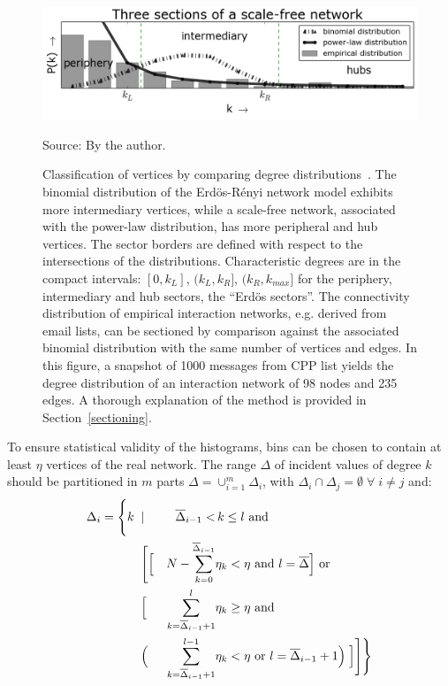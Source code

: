 \clearpage
\begin{figure}[!h]
\centering
\includegraphics[width=\textwidth]{figs/fser__}
\caption{Classification of vertices by comparing degree
distributions~\cite{3setores}.
The binomial distribution of the Erd\"os-R\'enyi network model exhibits more intermediary vertices, while a scale-free network, associated with the power-law distribution, has more peripheral and hub vertices. The sector borders are defined with respect to the intersections of the distributions. Characteristic degrees are in the compact intervals: $[0,k_L]$, $(k_L,k_R]$, $(k_R,k_{max}]$ for the periphery, intermediary and hub sectors, the ``Erd\"os sectors''.
The connectivity distribution of empirical interaction networks, e.g. derived from email lists, can be sectioned by comparison against the associated binomial distribution with the same number of vertices and edges. In this figure, a snapshot of 1000 messages from CPP list yields the degree distribution of an interaction network of 98 nodes and 235 edges. A thorough explanation of the method is provided in Section~\ref{sectioning}.}
\label{fig:setores}
\begin{flushleft}\footnotesize
Source: By the author.\
\end{flushleft}
\end{figure}

To ensure statistical validity of the histograms, bins can be chosen to contain at least $\eta$ vertices of the real network.
The range $\Delta$ of incident values of degree $k$ should be partitioned in $m$ parts $\Delta=\cup_{i=1}^m \Delta_i$,
with $\Delta_i\cap \Delta_j=\emptyset \; \forall\; i \neq j$ and:
\begin{align}
\Delta_i =\Biggl\{ k\;\; & | & \overline{\Delta}_{i-1}< &\, k\leq l \text{ and }\;\;\;\;\;\;\;\;\;\;\;\;\nonumber\\
& \Biggl[ \Bigl[ & N - \sum_{k=0}^{\overline{\Delta}_{i-1}} & \eta_k< \eta \text{ and } l = \overline{\Delta} \Bigr] \text{ or }\\
& \Bigl[ & \sum_{k=\overline{\Delta}_{i-1}+1}^l & \eta_k \geq \eta \text{ and }\;\;\;\;\;\;\nonumber\\
& \Bigl( &\sum_{k=\overline{\Delta}_{i-1}+1}^{l-1} & \eta_k < \eta \text{ or } l=\overline{\Delta}_{i-1}+1 \Bigr) \;\Bigr] \Biggr] \Biggr\}\nonumber
\end{align}

